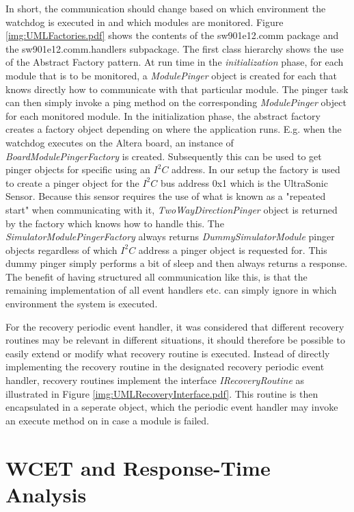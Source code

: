 In short, the communication should change based on which environment the watchdog is executed in and which modules are monitored. Figure \ref{img:UMLFactories.pdf} shows the contents of the sw901e12.comm package and the sw901e12.comm.handlers subpackage.
The first class hierarchy shows the use of the Abstract Factory pattern. At run time in the \emph{initialization} phase, for each module that is to be monitored, a \emph{ModulePinger} object is created for each that knows directly how to communicate with that particular module. The pinger task can then simply invoke a ping method on the corresponding \emph{ModulePinger} object for each monitored module. In the initialization phase, the abstract factory creates a factory object depending on where the application runs. E.g. when the watchdog executes on the Altera board, an instance of \emph{BoardModulePingerFactory} is created. Subsequently this can be used to get pinger objects for specific using an $\textit{I}^2\textit{C}$ address. In our setup the factory is used to create a pinger object for the $\textit{I}^2\textit{C}$ bus address 0x1 which is the UltraSonic Sensor. Because this sensor requires the use of what is known as a "repeated start" when communicating with it, \emph{TwoWayDirectionPinger} object is returned by the factory which knows how to handle this.
The \emph{SimulatorModulePingerFactory} always returns \emph{DummySimulatorModule} pinger objects regardless of which $\textit{I}^2\textit{C}$ address a pinger object is requested for. This dummy pinger simply performs a bit of sleep and then always returns a response. The benefit of having structured all communication like this, is that the remaining implementation of all event handlers etc. can simply ignore in which environment the system is executed.

For the recovery periodic event handler, it was considered that different recovery routines may be relevant in different situations, it should therefore be possible to easily extend or modify what recovery routine is executed. Instead of directly implementing the recovery routine in the designated recovery periodic event handler, recovery routines implement the interface \emph{IRecoveryRoutine} as illustrated in Figure \ref{img:UMLRecoveryInterface.pdf}. This routine is then encapsulated in a seperate object, which the periodic event handler may invoke an execute method on in case a module is failed.

\chapter{WCET and Response-Time Analysis}
\label{chapter:wcetrta}

